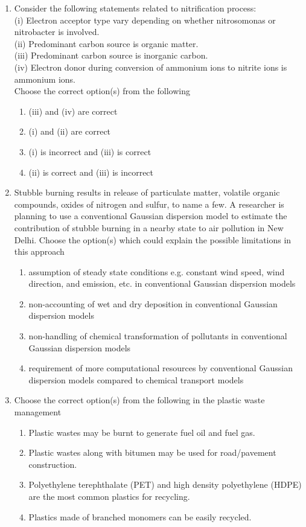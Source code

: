 \documentclass[journal]{IEEEtran}
\begin{document}
\begin{enumerate}[resume]
\item Consider the following statements related to nitrification process: \\
(i) Electron acceptor type vary depending on whether nitrosomonas or nitrobacter is involved. \\
(ii) Predominant carbon source is organic matter. \\
(iii) Predominant carbon source is inorganic carbon. \\
(iv) Electron donor during conversion of ammonium ions to nitrite ions is ammonium ions. \\
Choose the correct option(s) from the following
\hfill{}
\begin{enumerate}
\item (iii) and (iv) are correct
\item (i) and (ii) are correct
\item (i) is incorrect and (iii) is correct
\item (ii) is correct and (iii) is incorrect
\end{enumerate}

\item Stubble burning results in release of particulate matter, volatile organic compounds, oxides of nitrogen and sulfur, to name a few. A researcher is planning to use a conventional Gaussian dispersion model to estimate the contribution of stubble burning in a nearby state to air pollution in New Delhi. Choose the option(s) which could explain the possible limitations in this approach
\hfill{}
\begin{enumerate}
\item assumption of steady state conditions e.g. constant wind speed, wind direction, and emission, etc. in conventional Gaussian dispersion models
\item non-accounting of wet and dry deposition in conventional Gaussian dispersion models
\item non-handling of chemical transformation of pollutants in conventional Gaussian dispersion models
\item requirement of more computational resources by conventional Gaussian dispersion models compared to chemical transport models
\end{enumerate}

\item Choose the correct option(s) from the following in the plastic waste management
\hfill{}
\begin{enumerate}
\item Plastic wastes may be burnt to generate fuel oil and fuel gas.
\item Plastic wastes along with bitumen may be used for road/pavement construction.
\item Polyethylene terephthalate (PET) and high density polyethylene (HDPE) are the most common plastics for recycling.
\item Plastics made of branched monomers can be easily recycled.
\end{enumerate}


\end{enumerate}
\end{document}
